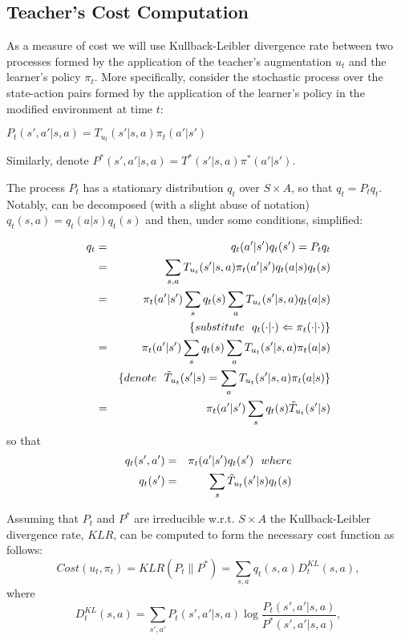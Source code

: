 \documentclass[letterpaper]{aamas2009}
\begin{document}
\subsection{Teacher's Cost Computation}
As a measure of cost we will use Kullback-Leibler divergence rate
between two processes formed by the application of the teacher's
augmentation $u_t$ and the learner's policy $\pi_t$. More specifically,
consider the stochastic process over the state-action pairs formed by
the application of the learner's policy in the modified environment at
time $t$: \\
\centerline{$
P_t(s',a'|s,a)=T_{u_t}(s'|s,a)\pi_t(a'|s')
$}

Similarly, denote $P^*(s',a'|s,a)=T^*(s'|s,a)\pi^*(a'|s')$.

The process $P_t$ has a stationary distribution $q_t$ over
  $S\times A$, so that $q_t=P_tq_t$. Notably, can be decomposed (with
  a slight abuse of notation) $q_t(s,a)=q_t(a|s)q_t(s)$ and then,
  under some conditions, simplified:

\begin{eqnarray*}
q_t&=&q_t(a'|s')q_t(s')=P_tq_t\\
&=&\sum\limits_{s,a}T_{u_t}(s'|s,a)\pi_t(a'|s')q_t(a|s)q_t(s)\\
&=&\pi_t(a'|s')\sum\limits_sq_t(s)\sum\limits_aT_{u_t}(s'|s,a)q_t(a|s)\\
&&\{\displaystyle{substitute}\ \ q_t(\cdot|\cdot)\Leftarrow\pi_t(\cdot|\cdot)\}\\
&=&\pi_t(a'|s')\sum\limits_sq_t(s)\sum\limits_aT_{u_t}(s'|s,a)\pi_t(a|s)\\
&&\{\displaystyle{denote}\ \ \Tilde{T}_{u_t}(s'|s)=\sum\limits_aT_{u_t}(s'|s,a)\pi_t(a|s)\}\\
&=&\pi_t(a'|s')\sum\limits_sq_t(s)\Tilde{T}_{u_t}(s'|s)
\end{eqnarray*}
so that
\begin{eqnarray*}
q_t(s',a')&=&\pi_t(a'|s')q_t(s')\ \ \displaystyle{where}\\
q_t(s')&=&\sum\limits_s\Tilde{T}_{u_t}(s'|s)q_t(s)
\end{eqnarray*}

Assuming that $P_t$ and $P^*$ are irreducible w.r.t. $S\times A$ the
Kullback-Leibler divergence rate, $KLR$, can be computed to form the
necessary cost function as follows:
$$
Cost(u_t,\pi_t)=KLR(P_t\|P^*)=\sum\limits_{s,a}q_t(s,a)D^{KL}_t(s,a),$$
where $$D^{KL}_t(s,a)=\sum\limits_{s',a'}P_t(s',a'|s,a)\log\frac{P_t(s',a'|s,a)}{P^*(s',a'|s,a)},
$$
\end{document}

